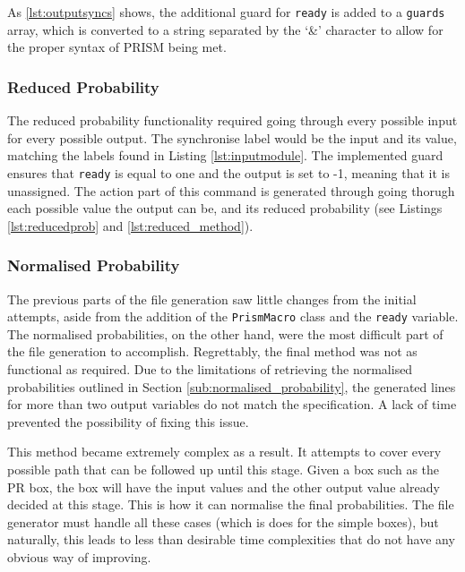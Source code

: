 \documentclass[report.tex]{subfiles}
\begin{document}


As \ref{lst:outputsyncs} shows, the additional guard for \texttt{ready} is
added to a \texttt{guards} array, which is converted to a string separated by
the `\&' character to allow for the proper syntax of PRISM being met.

\subsubsection{Reduced Probability} %
\label{ssub:reduced_probability}
The reduced probability functionality required going through every possible
input for every possible output. The synchronise label would be the input and
its value, matching the labels found in Listing \ref{lst:inputmodule}. The
implemented guard ensures that \texttt{ready} is equal to one and the output
is set to -1, meaning that it is unassigned. The action part of this command is
generated through going thorugh each possible value the output can be, and its
reduced probability (see Listings \ref{lst:reducedprob} and 
\ref{lst:reduced_method}).

\subsubsection{Normalised Probability} %
\label{ssub:normalised_probability}
The previous parts of the file generation saw little changes from the initial
attempts, aside from the addition of the \texttt{PrismMacro} class and the
\texttt{ready} variable. The normalised probabilities, on the other hand, were
the most difficult part of the file generation to accomplish. Regrettably, the
final method was not as functional as required. Due to the limitations of
retrieving the normalised probabilities outlined in Section 
\ref{sub:normalised_probability}, the generated lines for more than two output
variables do not match the specification. A lack of time prevented the
possibility of fixing this issue.

This method became extremely complex as a result. It attempts to cover every
possible path that can be followed up until this stage. Given a box such as the
PR box, the box will have the input values and the other output value already
decided at this stage. This is how it can normalise the final probabilities.
The file generator must handle all these cases (which is does for the simple
boxes), but naturally, this leads to less than desirable time complexities
that do not have any obvious way of improving.
\end{document}
